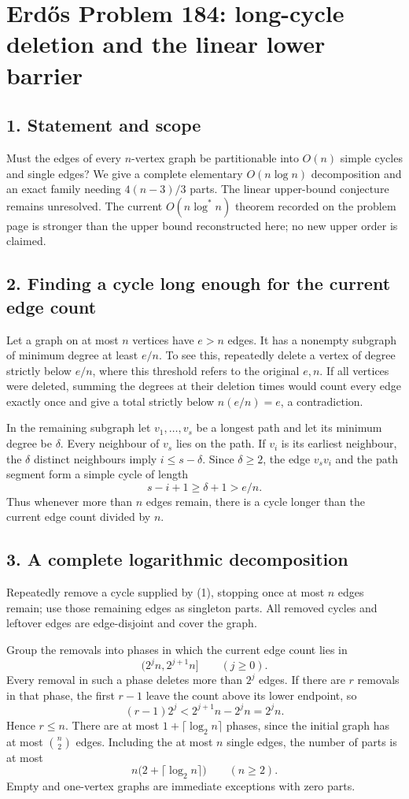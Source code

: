 \section*{Erd\H{o}s Problem 184: long-cycle deletion and the linear lower barrier}

\subsection*{1. Statement and scope}
Must the edges of every $n$-vertex graph be partitionable into $O(n)$ simple cycles and single edges? We give a complete elementary $O(n\log n)$ decomposition and an exact family needing $4(n-3)/3$ parts. The linear upper-bound conjecture remains unresolved. The current $O(n\log^*n)$ theorem recorded on the problem page is stronger than the upper bound reconstructed here; no new upper order is claimed.

\subsection*{2. Finding a cycle long enough for the current edge count}
Let a graph on at most $n$ vertices have $e>n$ edges. It has a nonempty subgraph of minimum degree at least $e/n$. To see this, repeatedly delete a vertex of degree strictly below $e/n$, where this threshold refers to the original $e,n$. If all vertices were deleted, summing the degrees at their deletion times would count every edge exactly once and give a total strictly below $n(e/n)=e$, a contradiction.

In the remaining subgraph let $v_1,\ldots,v_s$ be a longest path and let its minimum degree be $\delta$. Every neighbour of $v_s$ lies on the path. If $v_i$ is its earliest neighbour, the $\delta$ distinct neighbours imply $i\le s-\delta$. Since $\delta\ge2$, the edge $v_sv_i$ and the path segment form a simple cycle of length
\[
 s-i+1\ge\delta+1>e/n.\tag{1}
\]
Thus whenever more than $n$ edges remain, there is a cycle longer than the current edge count divided by $n$.

\subsection*{3. A complete logarithmic decomposition}
Repeatedly remove a cycle supplied by (1), stopping once at most $n$ edges remain; use those remaining edges as singleton parts. All removed cycles and leftover edges are edge-disjoint and cover the graph.

Group the removals into phases in which the current edge count lies in
\[
 (2^j n,2^{j+1}n]\qquad(j\ge0).
\]
Every removal in such a phase deletes more than $2^j$ edges. If there are $r$ removals in that phase, the first $r-1$ leave the count above its lower endpoint, so
\[
 (r-1)2^j<2^{j+1}n-2^jn=2^jn.
\]
Hence $r\le n$. There are at most $1+\lceil\log_2 n\rceil$ phases, since the initial graph has at most $\binom n2$ edges. Including the at most $n$ single edges, the number of parts is at most
\[
 n\bigl(2+\lceil\log_2 n\rceil\bigr)\qquad(n\ge2).\tag{2}
\]
Empty and one-vertex graphs are immediate exceptions with zero parts.

